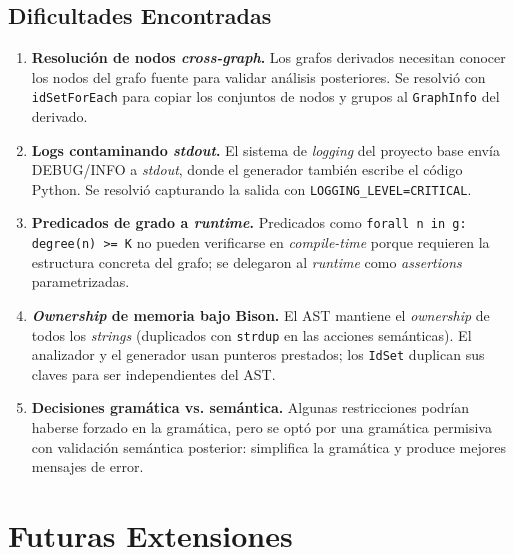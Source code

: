 \documentclass[11pt,a4paper]{article}
\newcommand{\code}[1]{\texttt{#1}}
\begin{document}
\subsection{Dificultades Encontradas}

\begin{enumerate}[noitemsep]
  \item \textbf{Resolución de nodos \emph{cross-graph}.} Los grafos derivados
        necesitan conocer los nodos del grafo fuente para validar análisis
        posteriores. Se resolvió con \code{idSetForEach} para copiar los
        conjuntos de nodos y grupos al \code{GraphInfo} del derivado.
  \item \textbf{Logs contaminando \emph{stdout}.} El sistema de \emph{logging}
        del proyecto base envía DEBUG/INFO a \emph{stdout}, donde el generador
        también escribe el código Python. Se resolvió capturando la salida con
        \code{LOGGING\_LEVEL=CRITICAL}.
  \item \textbf{Predicados de grado a \emph{runtime}.} Predicados como
        \code{forall n in g: degree(n) >= K} no pueden verificarse en
        \emph{compile-time} porque requieren la estructura concreta del grafo;
        se delegaron al \emph{runtime} como \emph{assertions} parametrizadas.
  \item \textbf{\emph{Ownership} de memoria bajo Bison.} El AST mantiene el
        \emph{ownership} de todos los \emph{strings} (duplicados con
        \code{strdup} en las acciones semánticas). El analizador y el generador
        usan punteros prestados; los \code{IdSet} duplican sus claves para ser
        independientes del AST.
  \item \textbf{Decisiones gramática vs. semántica.} Algunas restricciones
        podrían haberse forzado en la gramática, pero se optó por una gramática
        permisiva con validación semántica posterior: simplifica la gramática y
        produce mejores mensajes de error.
\end{enumerate}

\section{Futuras Extensiones}
\end{document}
